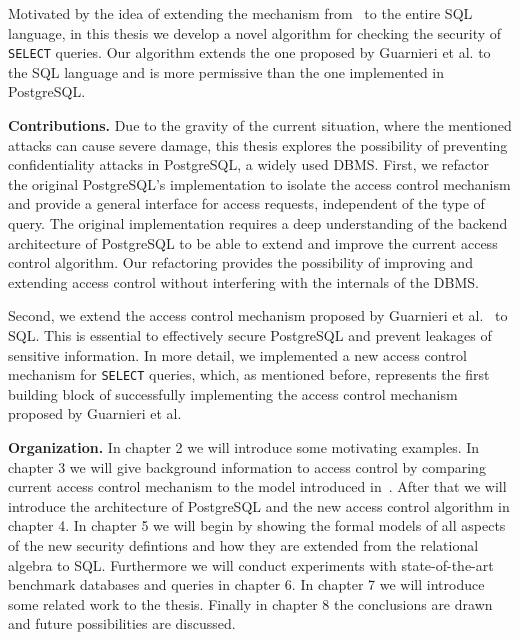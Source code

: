 Motivated by the idea of extending the mechanism from~\cite{guarnieri2016strong} to the entire SQL language, in this thesis we develop a novel algorithm for checking the security of \texttt{SELECT} queries.
%
Our algorithm extends the one proposed by Guarnieri et al. to the SQL language and is more permissive than the one implemented in PostgreSQL.

\smallskip
\noindent
{\bf Contributions.}
%
Due to the gravity of the current situation, where the mentioned attacks can cause severe damage, this thesis explores the possibility of preventing confidentiality attacks in PostgreSQL, a widely used DBMS.
%
First, we refactor the original PostgreSQL's implementation to isolate the access control mechanism and provide a general interface for access requests, independent of the type of query.
%
The original implementation requires a deep understanding of the backend architecture of PostgreSQL to be able to extend and improve the current access control algorithm.
%
Our refactoring provides the possibility of improving and extending access control without interfering with the internals of the DBMS.

Second, we extend the access control mechanism proposed by Guarnieri et al.~\cite{guarnieri2016strong} to SQL.
%
This is essential to effectively secure PostgreSQL and prevent leakages of sensitive information.
%
In more detail, we implemented a new access control mechanism for \texttt{SELECT} queries, which, as mentioned before, represents the first building block of successfully implementing the access control mechanism proposed by Guarnieri et al.

\smallskip
\noindent
{\bf Organization.}
%
In chapter 2 we will introduce some motivating examples.
%
In chapter 3 we will give background information to access control by comparing current access control mechanism to the model introduced in~\cite{guarnieri2016strong}.
%
After that we will introduce the architecture of PostgreSQL and the new access control algorithm in chapter 4. 
%
In chapter 5 we will begin by showing the formal models of all aspects of the new security defintions and how they are extended from the relational algebra to SQL. 
%
Furthermore we will conduct experiments with state-of-the-art benchmark databases and queries in chapter 6. 
%
In chapter 7 we will introduce some related work to the thesis. 
%
Finally in chapter 8 the conclusions are drawn and future possibilities are discussed.